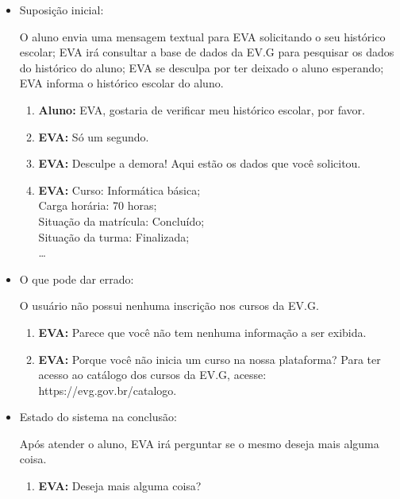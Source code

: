 \begin{itemize}
    \item Suposição inicial:
    
        O aluno envia uma mensagem textual para EVA solicitando o seu histórico escolar; EVA irá consultar a base de dados da EV.G para pesquisar os dados do histórico do aluno; EVA se desculpa por ter deixado o aluno esperando; EVA informa o histórico escolar do aluno.
        
        \begin{enumerate}
            \item \textbf{Aluno:} EVA, gostaria de verificar meu histórico escolar, por favor.
            \item \textbf{EVA:} Só um segundo.
            \item \textbf{EVA:} Desculpe a demora! Aqui estão os dados que você solicitou.
            \item \textbf{EVA:} Curso: Informática básica; \\
            Carga horária: 70 horas; \\
            Situação da matrícula: Concluído; \\
            Situação da turma: Finalizada;\\ \ldots
        \end{enumerate}
    
    \item O que pode dar errado:
    
        O usuário não possui nenhuma inscrição nos cursos da EV.G.
        
        \begin{enumerate}
            \item \textbf{EVA:} Parece que você não tem nenhuma informação a ser exibida.
            \item \textbf{EVA:} Porque você não inicia um curso na nossa plataforma? Para ter acesso ao catálogo dos cursos da EV.G, acesse: https://evg.gov.br/catalogo.
\end{enumerate}
    
    \item Estado do sistema na conclusão:
    
        Após atender o aluno, EVA irá perguntar se o mesmo deseja mais alguma coisa.
        
        \begin{enumerate}
            \item \textbf{EVA:} Deseja mais alguma coisa?
        \end{enumerate}
    \end{itemize}

